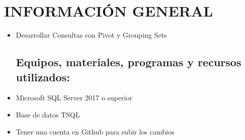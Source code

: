 \section{INFORMACIÓN GENERAL} 

\begin{itemize}
\subsection{Objetivos:}
	\item Desarrollar  Consultas con Pivot y Grouping Sets
\subsection{Equipos, materiales, programas y recursos utilizados:}
	\item Microsoft SQL Server 2017 o superior
	\item Base de datos TSQL
	\item Tener una cuenta en Github para subir los cambios


\end{itemize}